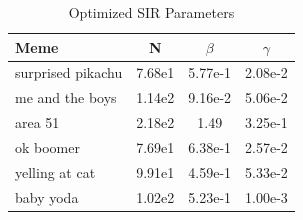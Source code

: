 \documentclass[12pt, letterpaper]{article}
\begin{document}
\begin{table}[htbp!]
\centering
    \caption{Optimized SIR Parameters}
    \begin{tabular}{@{\extracolsep{1em}}lccc}
        \toprule
        Meme & N & $\beta$ & $\gamma$ \\
        \midrule
        surprised pikachu & 7.68e1 & 5.77e-1 & 2.08e-2\\
        me and the boys & 1.14e2 & 9.16e-2 & 5.06e-2 \\
        area 51 & 2.18e2 & 1.49 & 3.25e-1\\ 
        ok boomer & 7.69e1 & 6.38e-1 & 2.57e-2\\ 
        yelling at cat & 9.91e1 & 4.59e-1 & 5.33e-2\\
        baby yoda & 1.02e2 & 5.23e-1 & 1.00e-3\\
        \bottomrule
    \end{tabular}
\end{table}
\end{document}
